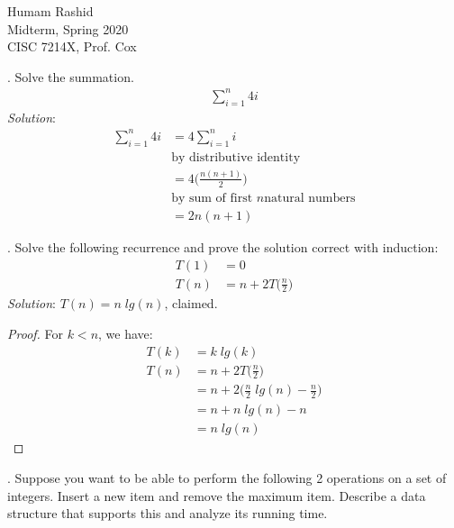 \documentclass{scrartcl}
\begin{document}
\begin{flushleft}
    Humam Rashid\\
    Midterm, Spring 2020\\
    CISC 7214X, Prof. Cox
\end{flushleft}
    \bigskip
    
    . Solve the summation.
    \begin{align*}
        \sum_{i=1}^{n} 4i
    \end{align*}
    \textit{Solution}:
    \begin{align*}
        \sum_{i=1}^{n} 4i &= 4 \sum_{i=1}^{n} i\\[6pt]&\text{by distributive identity}\\[6pt]
                          &= 4 \bigg(\frac{n (n + 1)}{2}\bigg)\\[6pt]&\text{by sum of first $n$
                          natural numbers}\\[6pt]
                          &= 2n(n + 1)
    \end{align*}

    \bigskip
    . Solve the following recurrence and prove the solution correct with induction:
    \begin{align*}
        T(1) &= 0\\
        T(n) &= n + 2 T\bigg(\frac{n}{2}\bigg)
    \end{align*}
    \textit{Solution}: $T(n) = n\;lg(n)$, claimed.\\
    \begin{proof}
        For $k < n$, we have:
        \begin{align*}
            T(k) &= k\;lg(k)\\
            T(n) &= n + 2 T\bigg(\frac{n}{2}\bigg)\\
                 &= n + 2 \bigg(\frac{n}{2}\;lg(n) - \frac{n}{2}\bigg)\\
                 &= n + n\;lg(n) - n\\
                 &= n\;lg(n)
        \end{align*}
    \end{proof}
    \newpage
    . Suppose you want to be able to perform the following 2 operations on a set of integers.
    Insert a new item and remove the maximum item. Describe a data structure that supports this and
    analyze its running time.\\
\end{document}
